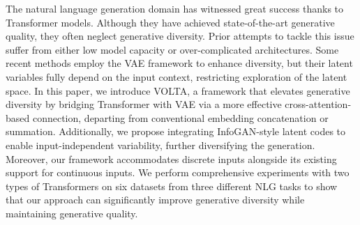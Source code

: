 The natural language generation domain has witnessed great success thanks to Transformer models. Although they have achieved state-of-the-art generative quality, they often neglect generative diversity. Prior attempts to tackle this issue suffer from either low model capacity or over-complicated architectures. Some recent methods employ the VAE framework to enhance diversity, but their latent variables fully depend on the input context, restricting exploration of the latent space. In this paper, we introduce VOLTA, a framework that elevates generative diversity by bridging Transformer with VAE via a more effective cross-attention-based connection, departing from conventional embedding concatenation or summation. Additionally, we propose integrating InfoGAN-style latent codes to enable input-independent variability, further diversifying the generation. Moreover, our framework accommodates discrete inputs alongside its existing support for continuous inputs. We perform comprehensive experiments with two types of Transformers on six datasets from three different NLG tasks to show that our approach can significantly improve generative diversity while maintaining generative quality.